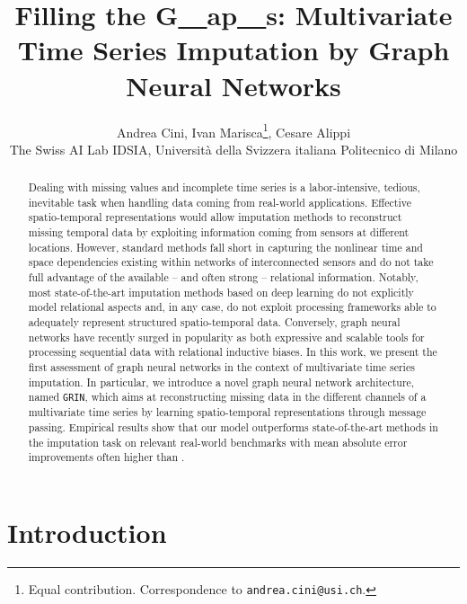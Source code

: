 \documentclass{article} \usepackage{iclr2022_conference,times}
\title{Filling the G\underline{~~}ap\underline{~~}s: Multivariate Time Series Imputation by Graph Neural Networks}
\author{Andrea Cini, Ivan Marisca\thanks{Equal contribution. Correspondence to \texttt{andrea.cini@usi.ch}.}\hspace{1.5mm}, Cesare Alippi\\
The Swiss AI Lab IDSIA, Universit\`a della Svizzera italiana Politecnico di Milano
}
\newcommand{\GRIL}{\texttt{GRIN}}
\begin{document}
\maketitle

\begin{abstract}
Dealing with missing values and incomplete time series is a labor-intensive, tedious, inevitable task when handling data coming from real-world applications. Effective spatio-temporal representations would allow imputation methods to reconstruct missing temporal data by exploiting information coming from sensors at different locations. However, standard methods fall short in capturing the nonlinear time and space dependencies existing within networks of interconnected sensors and do not take full advantage of the available -- and often strong -- relational information. Notably, most state-of-the-art imputation methods based on deep learning do not explicitly model relational aspects and, in any case, do not exploit processing frameworks able to adequately represent structured spatio-temporal data.
Conversely, graph neural networks have recently surged in popularity as both expressive and scalable tools for processing sequential data with relational inductive biases. In this work, we present the first assessment of graph neural networks in the context of multivariate time series imputation. In particular, we introduce a novel graph neural network architecture, named \GRIL, which aims at reconstructing missing data in the different channels of a multivariate time series by learning spatio-temporal representations through message passing. Empirical results show that our model outperforms state-of-the-art methods in the imputation task on relevant real-world benchmarks with mean absolute error improvements often higher than .
\end{abstract}

\section{Introduction}
\end{document}
